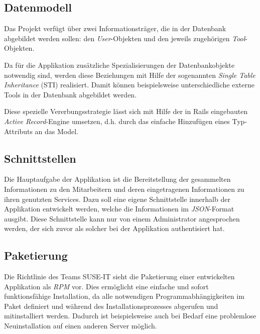 \subsection{Datenmodell}
\label{sec:Datenmodell}
Das Projekt verfügt über zwei Informationsträger, die in der Datenbank abgebildet werden
sollen: den \textit{User}-Objekten und den jeweils zugehörigen \textit{Tool}-Objekten.


Da für die Applikation zusätzliche Spezialisierungen der Datenbankobjekte notwendig sind, werden
diese Beziehungen mit Hilfe der sogenannten \textit{Single Table Inheritance} (\acs{STI}) realisiert.
Damit können beispielsweise unterschiedliche externe Tools in der Datenbank abgebildet werden.


Diese spezielle Vererbungsstrategie lässt sich mit Hilfe der in Rails eingebauten
\textit{Active Record}-Engine umsetzen, d.h. durch das einfache Hinzufügen eines Typ-Attributs an das Model.

\subsection{Schnittstellen}
\label{sec:Schnittstellen}
Die Hauptaufgabe der Applikation ist die Bereitstellung der gesammelten Informationen zu den
Mitarbeitern und deren eingetragenen Informationen zu ihren genutzten Services. Dazu soll eine
eigene Schnittstelle innerhalb der Applikation entwickelt werden, welche die Informationen im
\textit{JSON}-Format ausgibt. Diese Schnittstelle kann nur von einem Administrator angesprochen
werden, der sich zuvor als solcher bei der Applikation authentisiert hat.


\subsection{Paketierung}
\label{sec:Paketierung}
Die Richtlinie des Teams SUSE-IT sieht die Paketierung einer entwickelten Applikation als
\textit{\acs{RPM}} vor. Dies ermöglicht eine einfache und sofort funktionsfähige Installation, da alle
notwendigen Programmabhängigkeiten im Paket definiert und während des Installationsprozesses
abgerufen und mitinstalliert werden. Dadurch ist beispielsweise auch bei Bedarf eine problemlose
Neuinstallation auf einen anderen Server möglich.
